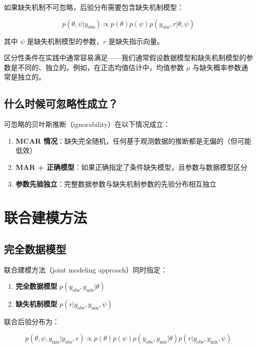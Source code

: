 如果缺失机制不可忽略，后验分布需要包含缺失机制模型：

\[
p(\theta, \psi | y_{\text{obs}}) \propto p(\theta) p(\psi) p(y_{\text{obs}}, r | \theta, \psi)
\label{eq:non-ignorability-posterior}
\]

其中 $\psi$ 是缺失机制模型的参数，$r$ 是缺失指示向量。

\begin{Remark}
  区分性条件在实践中通常容易满足——我们通常假设数据模型和缺失机制模型的参数是不同的、独立的。例如，在正态均值估计中，均值参数 $\mu$ 与缺失概率参数通常是独立的。
\end{Remark}

\subsection{什么时候可忽略性成立？}
\label{sec:when-ignorability-holds}

可忽略的贝叶斯推断（ignorability）在以下情况成立：

\begin{enumerate}
  \item \textbf{MCAR 情况}：缺失完全随机，任何基于观测数据的推断都是无偏的（但可能低效）
  \item \textbf{MAR + 正确模型}：如果正确指定了条件缺失模型，且参数与数据模型区分
  \item \textbf{参数先验独立}：完整数据参数与缺失机制参数的先验分布相互独立
\end{enumerate}

\section{联合建模方法}
\label{sec:joint-modeling}

\subsection{完全数据模型}

联合建模方法（joint modeling approach）同时指定：

\begin{enumerate}
  \item \textbf{完全数据模型} $p(y_{\text{obs}}, y_{\text{mis}} | \theta)$
  \item \textbf{缺失机制模型} $p(r | y_{\text{obs}}, y_{\text{mis}}, \psi)$
\end{enumerate}

联合后验分布为：

\[
p(\theta, \psi, y_{\text{mis}} | y_{\text{obs}}, r) \propto p(\theta) p(\psi) p(y_{\text{obs}}, y_{\text{mis}} | \theta) p(r | y_{\text{obs}}, y_{\text{mis}}, \psi)
\label{eq:joint-posterior}
\]

